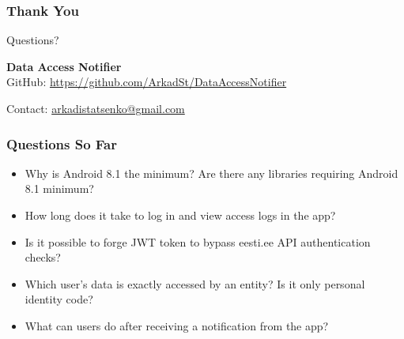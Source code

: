 \documentclass[aspectratio=169,11pt]{beamer}
\begin{document}
\begin{frame}
\frametitle{Thank You}
\begin{center}
\Large Questions?

\vspace{1cm}

\normalsize
\textbf{Data Access Notifier}\\
GitHub: \url{https://github.com/ArkadSt/DataAccessNotifier}

\vspace{0.5cm}

Contact: \href{mailto:arkadistatsenko@gmail.com}{arkadistatsenko@gmail.com}
\end{center}
\end{frame}

\begin{frame}
    \frametitle{Questions So Far}
    \begin{itemize}
        \item Why is Android 8.1 the minimum? Are there any libraries requiring Android 8.1 minimum?
        \item How long does it take to log in and view access logs in the app?
        \item Is it possible to forge JWT token to bypass eesti.ee API authentication checks?
        \item Which user's data is exactly accessed by an entity? Is it only personal identity code?
        \item What can users do after receiving a notification from the app?
    \end{itemize}
\end{frame}
\end{document}
